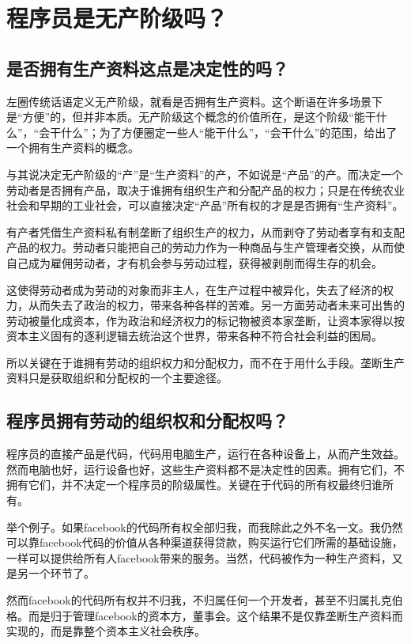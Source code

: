 \documentclass[punct=kaiming, zihao=5, openany, fontset=sikou]{ctexbook}
\begin{document}
\section{程序员是无产阶级吗？}
\subsection{是否拥有生产资料这点是决定性的吗？}
左圈传统话语定义无产阶级，就看是否拥有生产资料。这个断语在许多场景下是“方便”的，但并非本质。无产阶级这个概念的价值所在，是这个阶级“能干什么”，“会干什么”；为了方便圈定一些人“能干什么”，“会干什么”的范围，给出了一个拥有生产资料的概念。

与其说决定无产阶级的“产”是“生产资料”的产，不如说是“产品”的产。而决定一个劳动者是否拥有产品，取决于谁拥有组织生产和分配产品的权力；只是在传统农业社会和早期的工业社会，可以直接决定“产品”所有权的才是是否拥有“生产资料”。

有产者凭借生产资料私有制垄断了组织生产的权力，从而剥夺了劳动者享有和支配产品的权力。劳动者只能把自己的劳动力作为一种商品与生产管理者交换，从而使自己成为雇佣劳动者，才有机会参与劳动过程，获得被剥削而得生存的机会。

这使得劳动者成为劳动的对象而非主人，在生产过程中被异化，失去了经济的权力，从而失去了政治的权力，带来各种各样的苦难。另一方面劳动者未来可出售的劳动被量化成资本，作为政治和经济权力的标记物被资本家垄断，让资本家得以按资本主义固有的逐利逻辑去统治这个世界，带来各种不符合社会利益的困局。

所以关键在于谁拥有劳动的组织权力和分配权力，而不在于用什么手段。垄断生产资料只是获取组织和分配权的一个主要途径。

\subsection{程序员拥有劳动的组织权和分配权吗？}
程序员的直接产品是代码，代码用电脑生产，运行在各种设备上，从而产生效益。然而电脑也好，运行设备也好，这些生产资料都不是决定性的因素。拥有它们，不拥有它们，并不决定一个程序员的阶级属性。关键在于代码的所有权最终归谁所有。

举个例子。如果facebook的代码所有权全部归我，而我除此之外不名一文。我仍然可以靠facebook代码的价值从各种渠道获得贷款，购买运行它们所需的基础设施，一样可以提供给所有人facebook带来的服务。当然，代码被作为一种生产资料，又是另一个环节了。

然而facebook的代码所有权并不归我，不归属任何一个开发者，甚至不归属扎克伯格。而是归于管理facebook的资本方，董事会。这个结果不是仅靠垄断生产资料而实现的，而是靠整个资本主义社会秩序。
\end{document}
